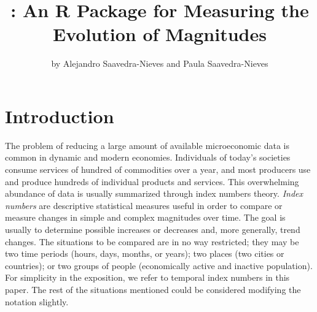 \title{: An R Package for Measuring the Evolution of Magnitudes}
\author{by Alejandro Saavedra-Nieves and Paula Saavedra-Nieves}

\maketitle

\vspace*{-0.25 cm}
\section{Introduction}


The problem of reducing a large amount of available microeconomic data is common in dynamic and modern economies. Individuals of today's societies consume services of hundred of commodities over a year, and most producers use and produce hundreds of individual products and services. This overwhelming abundance of data is usually summarized through index numbers theory. \emph{Index numbers} are descriptive statistical measures useful in order to compare or measure changes in simple and complex magnitudes over time. The goal is usually to determine possible increases or decreases and, more generally, trend changes. The situations to be compared are in no way restricted; they may be two time periods (hours, days, months, or years); two places (two cities or countries); or two groups of people (economically active and inactive population). For simplicity in the exposition, we  refer to temporal index numbers in this paper. The rest of the situations mentioned could be considered modifying the notation slightly.  

